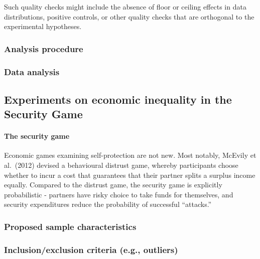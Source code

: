 \documentclass[
  english,
  man]{apa6}
\let\oldparagraph\paragraph
\renewcommand{\paragraph}[1]{\oldparagraph{#1}\mbox{}}
\begin{document}
Such quality checks might include the absence of floor or ceiling effects in data distributions, positive controls, or other quality checks that are orthogonal to the experimental hypotheses.

\hypertarget{analysis-procedure}{%
\subsubsection{Analysis procedure}\label{analysis-procedure}}

\hypertarget{data-analysis}{%
\subsubsection{Data analysis}\label{data-analysis}}

\hypertarget{experiments-on-economic-inequality-in-the-security-game}{%
\subsection{Experiments on economic inequality in the Security Game}\label{experiments-on-economic-inequality-in-the-security-game}}

\hypertarget{the-security-game}{%
\paragraph{The security game}\label{the-security-game}}

Economic games examining self-protection are not new. Most notably, McEvily et al.~(2012) devised a behavioural distrust game, whereby participants choose whether to incur a cost that guarantees that their partner splits a surplus income equally. Compared to the distrust game, the security game is explicitly probabilistic - partners have risky choice to take funds for themselves, and security expenditures reduce the probability of successful ``attacks.''

\hypertarget{proposed-sample-characteristics-1}{%
\subsubsection{Proposed sample characteristics}\label{proposed-sample-characteristics-1}}

\hypertarget{inclusionexclusion-criteria-e.g.-outliers-1}{%
\subsubsection{Inclusion/exclusion criteria (e.g., outliers)}\label{inclusionexclusion-criteria-e.g.-outliers-1}}
\end{document}

